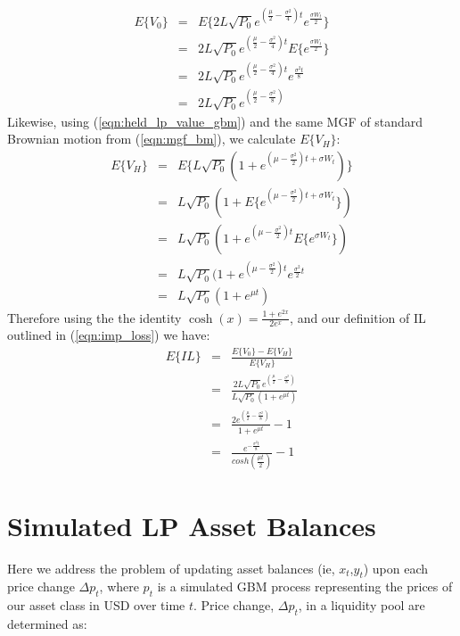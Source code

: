 \documentclass[journal,twocolumn,12pt]{ieeesyscoin}
\begin{document}
\begin{eqnarray*}\label{eqn:derivation_exp_v0}
E\{V_{0}\} &=& E\{2L \sqrt{P_{0}} e^{(\frac{\mu}{2} - \frac{\sigma^2}{4})t } e^{\frac{\sigma W_{t}}{2}} \} \\ 
           &=& 2L \sqrt{P_{0}} e^{(\frac{\mu}{2} - \frac{\sigma^2}{4})t } E\{e^{ \frac{\sigma W_{t}}{2} }\} \\
           &=& 2L \sqrt{P_{0}} e^{(\frac{\mu}{2} - \frac{\sigma^2}{4})t } e^{\frac{\sigma^2 t}{8}} \\
           &=&  2L \sqrt{P_{0}}e^{( \frac{\mu}{2} - \frac{\sigma^2}{8})}
\end{eqnarray*}
Likewise, using (\ref{eqn:held_lp_value_gbm}) and the same MGF of standard Brownian motion from (\ref{eqn:mgf_bm}), we calculate $E\{V_{H}\}$: 
\begin{eqnarray*}\label{eqn:derivation_exp_vH}
E\{V_{H}\} &=& E\{L \sqrt{P_{0}}(1 + e^{(\mu - \frac{\sigma^2}{2})t + \sigma W_{t} })\} \\
		   &=& L \sqrt{P_{0}}(1 + E\{ e^{(\mu - \frac{\sigma^2}{2})t + \sigma W_{t} }  \}) \\
		   &=& L \sqrt{P_{0}}(1 + e^{(\mu - \frac{\sigma^2}{2})t} E\{e^{\sigma W_{t}}\} ) \\
		   &=& L \sqrt{P_{0}}(1 + e^{(\mu - \frac{\sigma^2}{2})t} e^{\frac{\sigma^2}{2}t} \\
		   &=& L \sqrt{P_{0}}(1 + e^{\mu t} )
\end{eqnarray*}
Therefore using the the identity $\cosh(x) = \frac{1 + e^{2x}}{2 e^x}$, and our definition of IL outlined in (\ref{eqn:imp_loss})  we have:
\begin{eqnarray*}\label{eqn:derivation_exp_IL}
E\{IL\} &=& \frac{E\{V_{0}\} - E\{V_{H}\}}{E\{V_{H}\}} \\
		&=& \frac{2L \sqrt{P_{0}}e^{( \frac{\mu}{2} - \frac{\sigma^2}{8})} }{L \sqrt{P_{0}}(1 + e^{\mu t} )}\\
		&=& \frac{2e^{( \frac{\mu}{2} - \frac{\sigma^2}{8})}}{1 + e^{\mu t}} - 1\\
		&=& \frac{e^{-\frac{\sigma^2 t}{8}}}{ cosh(\frac{\mu t}{2})} - 1
\end{eqnarray*}


\section{Simulated LP Asset Balances}
\label{sec:sim_lp_balances}
Here we address the problem of updating asset balances (ie, $x_{t}$,$y_{t}$) upon each price change $\Delta p_{t}$, where $p_{t}$ is a simulated GBM process representing the prices of our asset class in USD over time $t$. Price change, $\Delta p_{t}$, in a liquidity pool are determined as:
\end{document}
